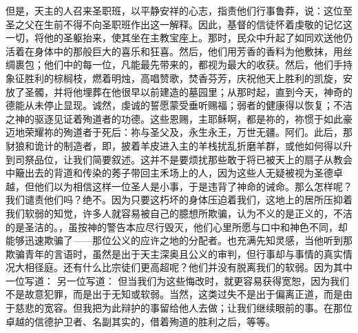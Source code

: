 但是，天主的人召来圣职班，以平静安祥的心志，指责他们行事鲁莽，说：这位至圣之父在生前不得不向圣职班作出这一解释。因此，基督的信徒怀着虔敬的记忆这一切，将他的圣躯抬来，使其坐在主教宝座上。那时，民众中升起了如同欢送他仍活着在身体中的那般巨大的喜乐和狂喜。然后，他们用芳香的香料为他敷抹，用丝绸裹包；他们中的每一位，凡能最先带来的，都视为最大的收获。然后，他们手持象征胜利的棕榈枝，燃着明烛，高唱赞歌，焚香芬芳，庆祝他天上胜利的凯旋，安放了圣髑，并将他埋葬在他很早以前建造的墓园里；从那时起，直到今天，神奇的德能从未停止显现。诚然，虔诚的誓愿蒙受垂听赐福；弱者的健康得以恢复；不洁之神的驱逐见证着殉道者的功德。这些恩赐，主耶稣啊，都是祢的，祢惯于如此豪迈地荣耀祢的殉道者于死后：祢与圣父及，永生永王，万世无疆。阿们。此后，那豺狼和诡计的制造者，即，披着羊皮进入主的羊栈扰乱折磨羊群，或他如何得以升到司祭品位，让我们简要叙述。这并不是要烦扰那些敢于将已被天上的扇子从教会中簸出去的背道和传染的莠子带回主禾场上的人，因为这些人无疑被视为圣德卓越，但他们以为相信这样一位圣人是小事，于是违背了神命的诫命。那么怎样呢？我们谴责他们吗？绝不。因为只要这朽坏的身体压迫着我们，这地上的居所压抑着我们软弱的知觉，许多人就容易被自己的臆想所欺骗，认为不义的是正义的，不洁的是圣洁的。，虽按神的警告本应尽行毁灭，他们心里所愿与口中和神色不同，却能够迅速欺骗了——那位公义的应许之地的分配者。也充满先知灵感，当他听到那欺骗青年的言语时，虽然是出于天主深奥且公义的审判，但行事却与事情的真实情况大相径庭。还有什么比宗徒们更高超呢？他们并没有脱离我们的软弱。因为其中一位写道： 另一位写道： 但当我们为这些悔改时，就更容易获得宽恕，因为我们不是故意犯罪，而是出于无知或软弱。当然，这类过失不是出于偏离正道，而是由于慈悲的宽容。但我把为此辩护的事留给他人去做；让我们继续眼前的事。在那位卓越的信德护卫者、名副其实的，借着殉道的胜利之后，等等。\par

\par

